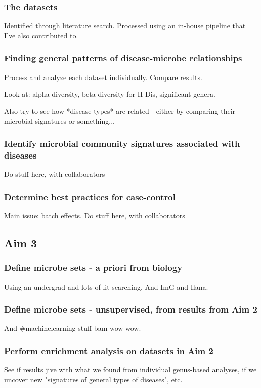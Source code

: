 \documentclass[12pt]{article}
\begin{document}
\subsubsection*{The datasets}
Identified through literature search.
Processed using an in-house pipeline that I've also contributed to.

\subsubsection*{Finding general patterns of disease-microbe relationships}
Process and analyze each dataset individually. Compare results.

Look at: alpha diversity, beta diversity for H-Dis, significant genera.

Also try to see how *disease types* are related - either by comparing their microbial signatures or something...

\subsubsection*{Identify microbial community signatures associated with diseases}
Do stuff here, with collaborators

\subsubsection*{Determine best practices for case-control}
Main issue: batch effects. 
Do stuff here, with collaborators

\subsection*{Aim 3}

\subsubsection*{Define microbe sets - a priori from biology}
Using an undergrad and lots of lit searching. And ImG and Ilana.

\subsubsection*{Define microbe sets - unsupervised, from results from Aim 2}
And \#machinelearning stuff bam wow wow.

\subsubsection*{Perform enrichment analysis on datasets in Aim 2}
See if results jive with what we found from individual genus-based analyses, if we uncover new "signatures of general types of diseases", etc.
\end{document}
